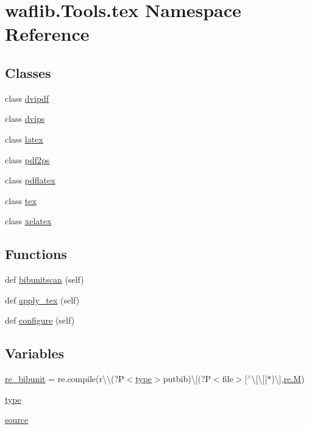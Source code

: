 \hypertarget{namespacewaflib_1_1_tools_1_1tex}{}\section{waflib.\+Tools.\+tex Namespace Reference}
\label{namespacewaflib_1_1_tools_1_1tex}
\subsection*{Classes}
\begin{DoxyCompactItemize}
\item 
class \hyperlink{classwaflib_1_1_tools_1_1tex_1_1dvipdf}{dvipdf}
\item 
class \hyperlink{classwaflib_1_1_tools_1_1tex_1_1dvips}{dvips}
\item 
class \hyperlink{classwaflib_1_1_tools_1_1tex_1_1latex}{latex}
\item 
class \hyperlink{classwaflib_1_1_tools_1_1tex_1_1pdf2ps}{pdf2ps}
\item 
class \hyperlink{classwaflib_1_1_tools_1_1tex_1_1pdflatex}{pdflatex}
\item 
class \hyperlink{classwaflib_1_1_tools_1_1tex_1_1tex}{tex}
\item 
class \hyperlink{classwaflib_1_1_tools_1_1tex_1_1xelatex}{xelatex}
\end{DoxyCompactItemize}
\subsection*{Functions}
\begin{DoxyCompactItemize}
\item 
def \hyperlink{namespacewaflib_1_1_tools_1_1tex_a0995543408e2b3f7705b148ffcce08b3}{bibunitscan} (self)
\item 
def \hyperlink{namespacewaflib_1_1_tools_1_1tex_ac13f6c937ac7ea4af8d30e2a71f312f0}{apply\+\_\+tex} (self)
\item 
def \hyperlink{namespacewaflib_1_1_tools_1_1tex_a63e6ed812ce192be695521518632025a}{configure} (self)
\end{DoxyCompactItemize}
\subsection*{Variables}
\begin{DoxyCompactItemize}
\item 
\hyperlink{namespacewaflib_1_1_tools_1_1tex_a9ea80e6d61d3c229a41e970979b3e35c}{re\+\_\+bibunit} = re.\+compile(r\textquotesingle{}\textbackslash{}\textbackslash{}(?P$<$\hyperlink{namespacewaflib_1_1_tools_1_1tex_a7638d43e3ce55594540ea118202a9a40}{type}$>$putbib)\textbackslash{}\mbox{[}(?P$<$file$>$\mbox{[}$^\wedge$\textbackslash{}\mbox{[}\textbackslash{}\mbox{]}\mbox{]}$\ast$)\textbackslash{}\mbox{]}\textquotesingle{},\hyperlink{rfft2d_test_m_l_8m_aad05f78187c942f9dd521605fa81f1ba}{re.\+M})
\item 
\hyperlink{namespacewaflib_1_1_tools_1_1tex_a7638d43e3ce55594540ea118202a9a40}{type}
\item 
\hyperlink{namespacewaflib_1_1_tools_1_1tex_a31a6a1fbec6ca2e256ca4db01feb1d69}{source}
\end{DoxyCompactItemize}


